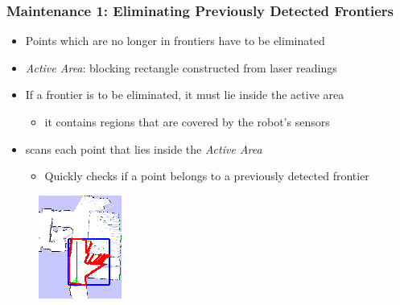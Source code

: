 \begin{frame}
\frametitle{Maintenance 1: Eliminating Previously Detected Frontiers}
\begin{itemize}
  \item Points which are no longer in frontiers have to be eliminated
  \item \emph{Active Area}: blocking rectangle constructed from laser
  readings
  \item If a frontier is to be eliminated, it must lie inside the active
  area
  	\begin{itemize}
  	  \item it contains regions that are covered by the robot's sensors
    \end{itemize} 
  \item \FFD scans each point that lies inside the \emph{Active Area}
  	\begin{itemize}
  	  \item Quickly checks if a point belongs to a previously detected frontier
  	\end{itemize} 
\end{itemize}

\begin{figure}
	 \centering
	 \includegraphics[angle=90,width=0.25\columnwidth,keepaspectratio]{images/active_area1}
\end{figure}
\end{frame}


